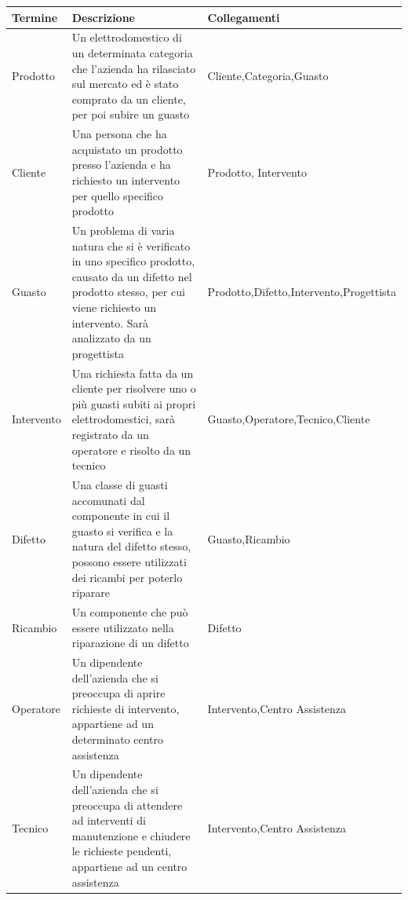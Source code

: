 \documentclass[a4paper, 12pt]{report}
\begin{document}
\begin{tabularx}{\linewidth}{>{\hsize=0.375\hsize}X|X|>{\hsize=0.475\hsize}X}
	\hline
	\textbf{Termine} & \textbf{Descrizione} & \textbf{Collegamenti}\\
	\hline
	\hline
	Prodotto & Un elettrodomestico di un determinata categoria che l'azienda ha rilasciato sul mercato ed è stato comprato da un cliente, per poi subire un guasto &
	Cliente,\newline Categoria,\newline Guasto\\
	\hline
	Cliente & Una persona che ha acquistato un prodotto presso l'azienda e ha richiesto un intervento per quello specifico prodotto & Prodotto,\newline 
	Intervento\\
	\hline
	Guasto & Un problema di varia natura che si è verificato in uno specifico prodotto, causato da un difetto nel prodotto stesso, per cui viene
	richiesto un intervento. Sarà analizzato da un progettista & Prodotto,\newline Difetto,\newline Intervento,\newline Progettista\\
	\hline
	Intervento & Una richiesta fatta da un cliente per risolvere uno o più guasti subiti ai propri elettrodomestici, sarà registrato da un operatore e risolto da un tecnico
	& Guasto,\newline Operatore,\newline Tecnico,\newline Cliente\\
	\hline
	Difetto & Una classe di guasti accomunati dal componente in cui il guasto si verifica e la natura del difetto stesso, possono essere utilizzati
	dei ricambi per poterlo riparare & Guasto,\newline Ricambio\\
	\hline
	Ricambio & Un componente che può essere utilizzato nella riparazione di un difetto & Difetto\\
	\hline
	Operatore & Un dipendente dell'azienda che si preoccupa di aprire richieste di intervento, appartiene ad un determinato centro assistenza
	& Intervento,\newline Centro Assistenza\\
	\hline
	Tecnico & Un dipendente dell'azienda che si preoccupa di attendere ad interventi di manutenzione e chiudere le richieste pendenti, appartiene
	ad un centro assistenza & Intervento,\newline Centro Assistenza\\

\end{tabularx}
\end{document}
